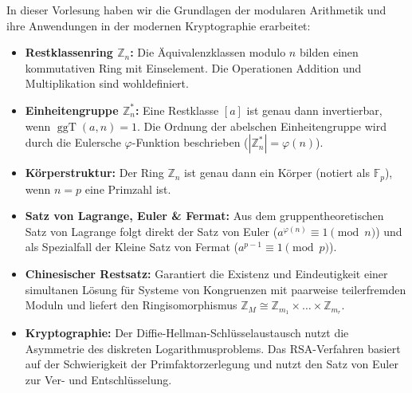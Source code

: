 \begin{nice-box}
In dieser Vorlesung haben wir die Grundlagen der modularen Arithmetik und ihre Anwendungen in der modernen Kryptographie erarbeitet:
\begin{itemize}
    \item \textbf{Restklassenring $\mathbb{Z}_n$:} Die Äquivalenzklassen modulo $n$ bilden einen kommutativen Ring mit Einselement. Die Operationen Addition und Multiplikation sind wohldefiniert.
    \item \textbf{Einheitengruppe $\mathbb{Z}_n^*$:} Eine Restklasse $[a]$ ist genau dann invertierbar, wenn $\operatorname{ggT}(a, n) = 1$. Die Ordnung der abelschen Einheitengruppe wird durch die Eulersche $\varphi$-Funktion beschrieben ($|\mathbb{Z}_n^*| = \varphi(n)$).
    \item \textbf{Körperstruktur:} Der Ring $\mathbb{Z}_n$ ist genau dann ein Körper (notiert als $\mathbb{F}_p$), wenn $n = p$ eine Primzahl ist.
    \item \textbf{Satz von Lagrange, Euler \& Fermat:} Aus dem gruppentheoretischen Satz von Lagrange folgt direkt der Satz von Euler ($a^{\varphi(n)} \equiv 1 \pmod n$) und als Spezialfall der Kleine Satz von Fermat ($a^{p-1} \equiv 1 \pmod p$).
    \item \textbf{Chinesischer Restsatz:} Garantiert die Existenz und Eindeutigkeit einer simultanen Lösung für Systeme von Kongruenzen mit paarweise teilerfremden Moduln und liefert den Ringisomorphismus $\mathbb{Z}_M \cong \mathbb{Z}_{m_1} \times \dots \times \mathbb{Z}_{m_r}$.
    \item \textbf{Kryptographie:} Der Diffie-Hellman-Schlüsselaustausch nutzt die Asymmetrie des diskreten Logarithmusproblems. Das RSA-Verfahren basiert auf der Schwierigkeit der Primfaktorzerlegung und nutzt den Satz von Euler zur Ver- und Entschlüsselung.
\end{itemize}
\end{nice-box}